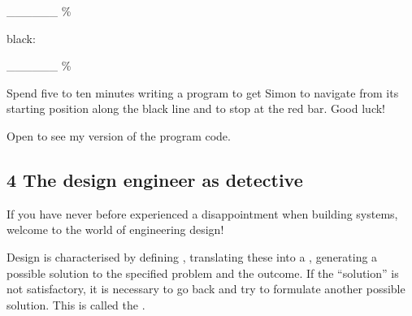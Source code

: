 \documentclass[letterpaper,10pt,english]{sphinxmanual}
\begin{document}
\_\_\_\_\_\_ \%









black:





\_\_\_\_\_\_ \%









Spend five to ten minutes writing a program to get Simon to navigate from its starting position along the black line and to stop at the red bar. Good luck!

Open  to see my version of the program code.

{
\begin{sphinxVerbatim}[commandchars=\\\{\}]
\llap{\color{nbsphinxin}[ ]:\,\hspace{\fboxrule}\hspace{\fboxsep}}
\end{sphinxVerbatim}
}


\subsection{4 The design engineer as detective}
\label{\detokenize{content/04_Robot_Lab/Section_00_04:4-The-design-engineer-as-detective}}\label{\detokenize{content/04_Robot_Lab/Section_00_04::doc}}
If you have never before experienced a disappointment when building systems, welcome to the world of engineering design!

Design is characterised by defining , translating these into a , generating a possible solution to the specified problem and  the outcome. If the “solution” is not satisfactory, it is necessary to go back and try to formulate another possible solution. This is called the  .
\end{document}
